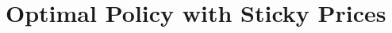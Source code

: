 \documentclass[11pt,a4paper,oneside]{book}
\begin{document}
\chapter{Optimal Policy with Sticky Prices}




\backmatter

\end{document}
